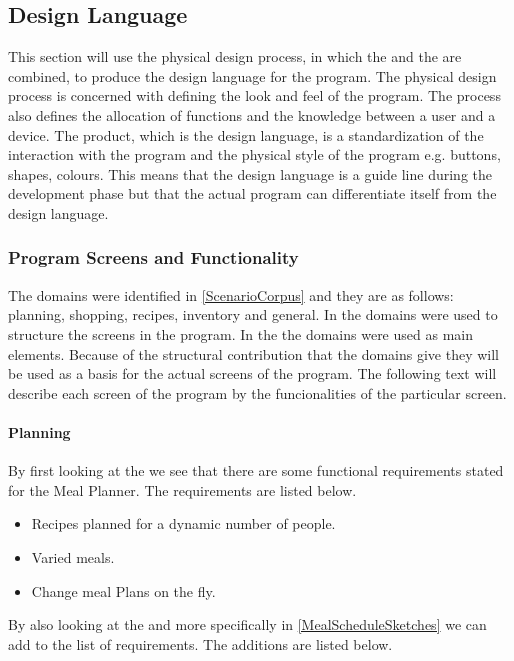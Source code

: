 \subsection{Design Language}
This section will use the physical design process, in which the  and the  are combined, to produce the design language for the program. The physical design process is concerned with defining the look and feel of the program. The process also defines the allocation of functions and the knowledge between a user and a device. The product, which is the design language, is a standardization of the interaction with the program and the physical style of the program e.g. buttons, shapes, colours. This means that the design language is a guide line during the development phase but that the actual program can differentiate itself from the design language.

\subsubsection{Program Screens and Functionality} \label{ScreensandFunctionality}
The domains were identified in \cref{ScenarioCorpus} and they are as follows: planning, shopping, recipes, inventory and general. In  the domains were used to structure the screens in the program. In the  the domains were used as main elements. Because of the structural contribution that the domains give they will be used as a basis for the actual screens of the program. The following text will describe each screen of the program by the funcionalities of the particular screen.

\paragraph{Planning}
By first looking at the  we see that there are some functional requirements stated for the Meal Planner. The requirements are listed below.

\begin{itemize}
\item Recipes planned for a dynamic number of people.
\item Varied meals.
\item Change meal Plans on the fly.
\end{itemize}  

By also looking at the  and more specifically in \cref{MealScheduleSketches} we can add to the list of requirements. The additions are listed below.

